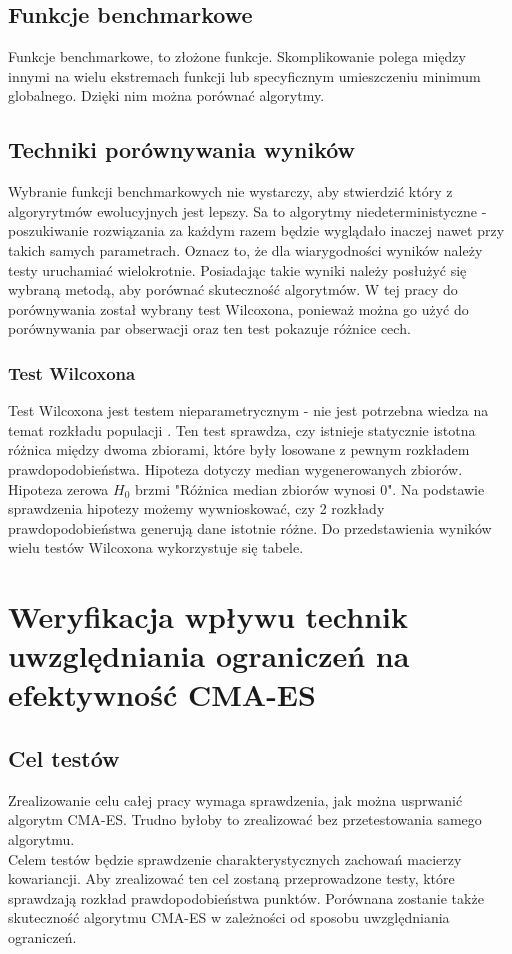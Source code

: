 \documentclass{mini}
\newcommand{\CMAES}{\mbox{CMA-ES}}
\begin{document}
\subsection{Funkcje benchmarkowe}
Funkcje benchmarkowe, to złożone funkcje. Skomplikowanie polega między innymi na wielu ekstremach funkcji lub specyficznym umieszczeniu minimum globalnego. Dzięki nim można porównać algorytmy.

\subsection{Techniki porównywania wyników}
Wybranie funkcji benchmarkowych nie wystarczy, aby stwierdzić który z algoryrytmów ewolucyjnych jest lepszy. Sa to algorytmy niedeterministyczne - poszukiwanie rozwiązania za każdym razem będzie wyglądało inaczej nawet przy takich samych parametrach. Oznacz to, że dla wiarygodności wyników należy testy uruchamiać wielokrotnie. Posiadając takie wyniki należy posłużyć się wybraną metodą, aby porównać skuteczność algorytmów. W tej pracy do porównywania został wybrany test Wilcoxona, ponieważ można go użyć do porównywania par obserwacji oraz ten test pokazuje różnice cech.

\subsubsection*{Test Wilcoxona}
Test Wilcoxona jest testem nieparametrycznym - nie jest potrzebna wiedza na temat rozkładu populacji \cite{wilcox}. Ten test sprawdza, czy istnieje statycznie istotna różnica między dwoma zbiorami, które były losowane z pewnym rozkładem prawdopodobieństwa. Hipoteza dotyczy median wygenerowanych zbiorów. Hipoteza zerowa $H_0$ brzmi "Różnica median zbiorów wynosi 0". Na podstawie sprawdzenia hipotezy możemy wywnioskować, czy 2 rozkłady prawdopodobieństwa generują dane istotnie różne. Do przedstawienia wyników wielu testów Wilcoxona wykorzystuje się tabele.

\pagebreak

\section{Weryfikacja wpływu technik uwzględniania ograniczeń na efektywność CMA-ES}

\subsection{Cel testów}
Zrealizowanie celu całej pracy wymaga sprawdzenia, jak można usprwanić algorytm \CMAES. Trudno byłoby to zrealizować bez przetestowania samego algorytmu.\\
Celem testów będzie sprawdzenie charakterystycznych zachowań macierzy kowariancji. Aby zrealizować ten cel zostaną przeprowadzone testy, które sprawdzają rozkład prawdopodobieństwa punktów. Porównana zostanie także skuteczność algorytmu CMA-ES w zależności od sposobu uwzględniania ograniczeń.
\end{document}
